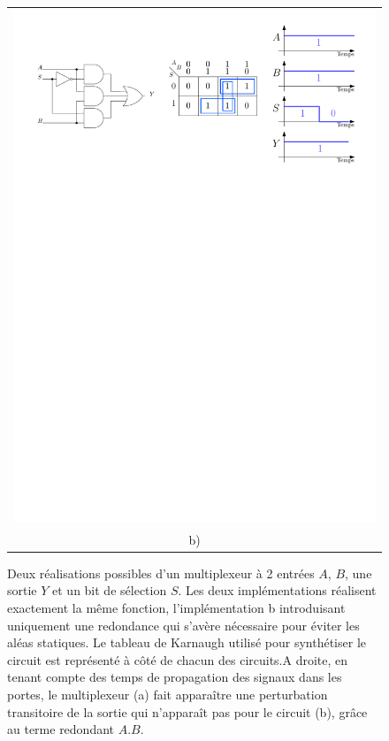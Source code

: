 \begin{figure}[htbp]
\begin{tabular}{c}
\includegraphics[width=\linewidth]{Figs/and_2e_mux2.pdf}\\
b)
\end{tabular}
\caption{\label{fig:and_2e_mux_aleas} Deux réalisations possibles d'un multiplexeur à 2 entrées $A$, $B$, une sortie $Y$ et un bit de sélection $S$. Les deux implémentations réalisent exactement la même fonction, l'implémentation b introduisant uniquement une redondance qui s'avère nécessaire pour éviter les aléas statiques. Le tableau de Karnaugh utilisé pour synthétiser le circuit est représenté à côté de chacun des circuits.A droite, en tenant compte des temps de propagation des signaux dans les portes, le multiplexeur (a) fait apparaître une perturbation transitoire de la sortie qui n'apparaît pas pour le circuit (b), grâce au terme redondant $A.B$.}
\end{figure}

